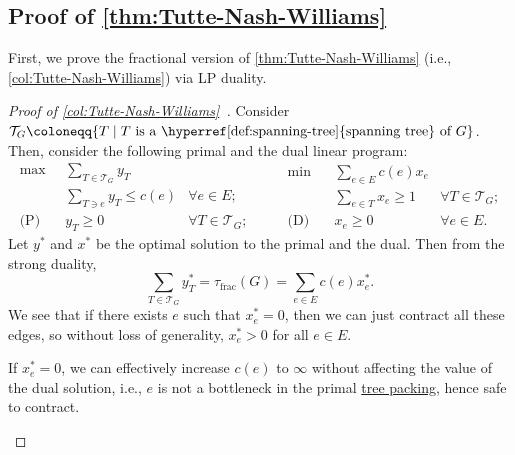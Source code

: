 \subsection{Proof of \autoref{thm:Tutte-Nash-Williams}}
First, we prove the fractional version of \autoref{thm:Tutte-Nash-Williams} (i.e., \autoref{col:Tutte-Nash-Williams}) via LP duality.

\begin{proof}[Proof of \autoref{col:Tutte-Nash-Williams}~\cite{chekuri2017near}]\label{pf:col:Tutte-Nash-Williams}
	Consider \(\mathcal{T} _G \coloneqq \{ T \mid T \text{ is a \hyperref[def:spanning-tree]{spanning tree} of } G \} \). Then, consider the following primal and the dual linear program:
	\[
		\begin{aligned}
			\max~           & \sum_{T \in \mathcal{T} _G} y_T                                 \\
			                & \sum_{T \ni e} y_T \leq c(e)    & \forall e \in E;              \\
			\text{(P)}\quad & y_T \geq 0                      & \forall T \in \mathcal{T} _G;
		\end{aligned}\qquad
		\begin{aligned}
			\min~           & \sum_{e \in E} c(e) x_e                                   \\
			                & \sum_{e \in T} x_e \geq 1 & \forall T \in \mathcal{T} _G; \\
			\text{(D)}\quad & x_e \geq 0                & \forall e \in E.
		\end{aligned}
	\]
	Let \(y^{\ast} \) and \(x^{\ast} \) be the optimal solution to the primal and the dual. Then from the strong duality,
	\[
		\sum_{T \in \mathcal{T} _G} y^{\ast} _T
		= \tau _{\text{frac} }(G)
		= \sum_{e \in E} c(e) x^{\ast} _e.
	\]
	We see that if there exists \(e\) such that \(x^{\ast} _e = 0\), then we can just contract all these edges, so without loss of generality, \(x^{\ast} _e > 0\) for all \(e \in E\).

	\begin{intuition}
		If \(x^{\ast} _e = 0\), we can effectively increase \(c(e)\) to \(\infty \) without affecting the value of the dual solution, i.e., \(e\) is not a bottleneck in the primal \hyperref[prb:TP]{tree packing}, hence safe to contract.
	\end{intuition}


\end{proof}
